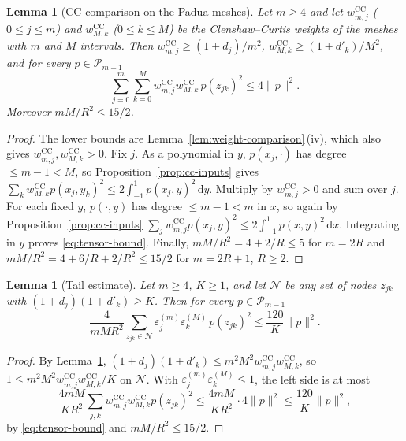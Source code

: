 \documentclass[preprint,12pt,a4paper]{elsarticle}
\newtheorem{lemma}[theorem]{Lemma}
\theoremstyle{remark}
\newcommand{\CC}{\mathrm{CC}}
\newcommand{\dd}{\,\mathrm d}
\begin{document}
\begin{lemma}[CC comparison on the Padua meshes]\label{lem:tensor-cc}
Let $m\ge4$ and let $w^{\CC}_{m,j}$ ($0\le j\le m$) and $w^{\CC}_{M,k}$
($0\le k\le M$) be the Clenshaw--Curtis weights of the meshes with $m$ and $M$
intervals. Then $w^{\CC}_{m,j}\ge(1+d_j)/m^2$, $w^{\CC}_{M,k}\ge(1+d'_k)/M^2$, and for every
$p\in\mathcal P_{m-1}$
\begin{equation}\label{eq:tensor-bound}
 \sum_{j=0}^m\sum_{k=0}^Mw^{\CC}_{m,j}w^{\CC}_{M,k}\,p(z_{jk})^2\le4\|p\|^2 .
\end{equation}
Moreover $mM/R^2\le15/2$.
\end{lemma}
\begin{proof}
The lower bounds are Lemma~\ref{lem:weight-comparison}\,(iv), which also gives
$w^{\CC}_{m,j},w^{\CC}_{M,k}>0$. Fix $j$. As a polynomial in $y$, $p(x_j,\cdot)$ has degree
$\le m-1<M$, so Proposition~\ref{prop:cc-inputs} gives
$\sum_kw^{\CC}_{M,k}p(x_j,y_k)^2\le2\int_{-1}^1p(x_j,y)^2\dd y$. Multiply by
$w^{\CC}_{m,j}>0$ and sum over $j$. For each fixed $y$, $p(\cdot,y)$ has degree
$\le m-1<m$ in $x$, so again by Proposition~\ref{prop:cc-inputs}
$\sum_jw^{\CC}_{m,j}p(x_j,y)^2\le2\int_{-1}^1p(x,y)^2\dd x$. Integrating in $y$
proves \eqref{eq:tensor-bound}. Finally, $mM/R^2=4+2/R\le5$ for $m=2R$ and
$mM/R^2=4+6/R+2/R^2\le15/2$ for $m=2R+1$, $R\ge2$.
\end{proof}

\begin{lemma}[Tail estimate]\label{lem:tail-estimate}
Let $m\ge4$, $K\ge1$, and let $\mathcal N$ be any set of nodes $z_{jk}$ with
$(1+d_j)(1+d'_k)\ge K$. Then for every $p\in\mathcal P_{m-1}$
\[
 \frac4{mMR^2}\sum_{z_{jk}\in\mathcal N}\varepsilon^{(m)}_j\varepsilon^{(M)}_k\,p(z_{jk})^2
 \le\frac{120}K\|p\|^2 .
\]
\end{lemma}
\begin{proof}
By Lemma~\ref{lem:tensor-cc}, $(1+d_j)(1+d'_k)\le m^2M^2w^{\CC}_{m,j}w^{\CC}_{M,k}$, so
$1\le m^2M^2w^{\CC}_{m,j}w^{\CC}_{M,k}/K$ on $\mathcal N$. With
$\varepsilon^{(m)}_j\varepsilon^{(M)}_k\le1$, the left side is at most
\[
 \frac{4mM}{KR^2}\sum_{j,k}w^{\CC}_{m,j}w^{\CC}_{M,k}p(z_{jk})^2
 \le\frac{4mM}{KR^2}\cdot4\|p\|^2\le\frac{120}K\|p\|^2,
\]
by \eqref{eq:tensor-bound} and $mM/R^2\le15/2$.
\end{proof}
\end{document}
